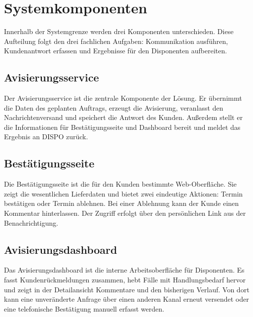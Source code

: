 \section{Systemkomponenten}

Innerhalb der Systemgrenze werden drei Komponenten unterschieden. Diese Aufteilung folgt den
drei fachlichen Aufgaben: Kommunikation ausführen, Kundenantwort erfassen und Ergebnisse für
den Disponenten aufbereiten.

\subsection{Avisierungsservice}

Der Avisierungsservice ist die zentrale Komponente der Lösung. Er übernimmt die Daten des
geplanten Auftrags, erzeugt die Avisierung, veranlasst den Nachrichtenversand und speichert
die Antwort des Kunden. Au\ss{}erdem stellt er die Informationen für Bestätigungsseite und
Dashboard bereit und meldet das Ergebnis an DISPO zurück.

\subsection{Bestätigungsseite}

Die Bestätigungsseite ist die für den Kunden bestimmte Web-Oberfläche. Sie zeigt die
wesentlichen Lieferdaten und bietet zwei eindeutige Aktionen: Termin bestätigen oder Termin
ablehnen. Bei einer Ablehnung kann der Kunde einen Kommentar hinterlassen. Der Zugriff erfolgt
über den persönlichen Link aus der Benachrichtigung.

\subsection{Avisierungsdashboard}

Das Avisierungsdashboard ist die interne Arbeitsoberfläche für Disponenten. Es fasst
Kundenrückmeldungen zusammen, hebt Fälle mit Handlungsbedarf hervor und zeigt in der
Detailansicht Kommentare und den bisherigen Verlauf. Von dort kann eine unveränderte Anfrage
über einen anderen Kanal erneut versendet oder eine telefonische Bestätigung manuell erfasst
werden.
